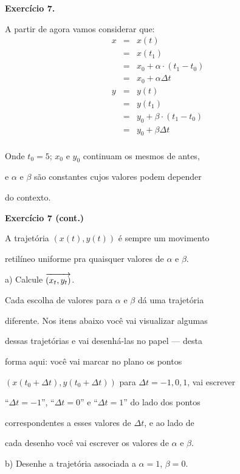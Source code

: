 \documentclass[oneside,12pt]{article}
\begin{document}
\newpage


{\bf Exercício 7.}

A partir de agora vamos considerar que:
%
$$\begin{array}{rcl}
  x &=& x(t) \\
    &=& x(t_1) \\
    &=& x_0 + α·(t_1-t_0) \\
    &=& x_0 + αΔt \\
  y &=& y(t) \\
    &=& y(t_1) \\
    &=& y_0 + β·(t_1-t_0) \\
    &=& y_0 + βΔt \\
  \end{array}
$$

Onde $t_0=5$; $x_0$ e $y_0$ continuam os mesmos de antes,

e $α$ e $β$ são constantes cujos valores podem depender

do contexto.

\newpage

{\bf Exercício 7 (cont.)}

A trajetória $(x(t), y(t))$ é sempre um movimento

retilíneo uniforme pra quaisquer valores de $α$ e $β$.

\ssk

a) Calcule ${\overrightarrow{(x_t, y_t)}}$.

\bsk

Cada escolha de valores para $α$ e $β$ dá uma trajetória

diferente. Nos itens abaixo você vai visualizar algumas

dessas trajetórias e vai desenhá-las no papel --- desta

forma aqui: você vai marcar no plano os pontos

$(x(t_0+Δt), y(t_0+Δt))$ para $Δt=-1,0,1$, vai escrever

``$Δt=-1$'', ``$Δt=0$'' e ``$Δt=1$'' do lado dos pontos

correspondentes a esses valores de $Δt$, e ao lado de

cada desenho você vai escrever os valores de $α$ e $β$.

\msk

b) Desenhe a trajetória associada a $α=1$, $β=0$.
\end{document}
